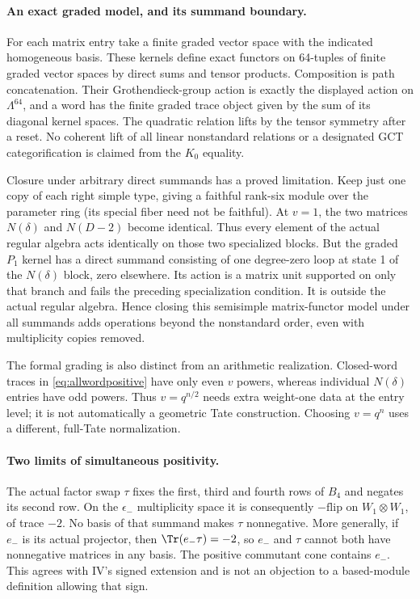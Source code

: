 \paragraph{An exact graded model, and its summand boundary.}
For each matrix entry take a finite graded vector space with the
indicated homogeneous basis. These kernels define exact functors
on 64-tuples of finite graded vector spaces by direct sums and
tensor products. Composition is path concatenation. Their
Grothendieck-group action is exactly the displayed action on
$\Lambda^{64}$, and a word has the finite graded trace object
given by the sum of its diagonal kernel spaces.
The quadratic relation lifts by the tensor symmetry after a reset.
No coherent lift of all linear nonstandard relations or a
designated GCT categorification is claimed from the $K_0$ equality.

Closure under arbitrary direct summands has a proved limitation.
Keep just one copy of each right simple type, giving a faithful
rank-six module over the parameter ring (its special fiber need not
be faithful). At $v=1$, the two matrices $N(\delta)$
and $N(D-2)$ become identical. Thus every element of the actual
regular algebra acts identically on those two specialized blocks.
But the graded $P_1$ kernel has a direct summand consisting of
one degree-zero loop at state 1 of the $N(\delta)$ block, zero
elsewhere. Its action is a matrix unit supported on only that
branch and fails the preceding specialization condition.
It is outside the actual regular algebra. Hence closing this
semisimple matrix-functor model under all summands adds operations
beyond the nonstandard order, even with multiplicity copies removed.

The formal grading is also distinct from an arithmetic realization.
Closed-word traces in \eqref{eq:allwordpositive} have only even
$v$ powers, whereas individual $N(\delta)$ entries have odd powers.
Thus $v=q^{n/2}$ needs extra weight-one data at the entry level;
it is not automatically a geometric Tate construction.
Choosing $v=q^n$ uses a different, full-Tate normalization.

\paragraph{Two limits of simultaneous positivity.}
The actual factor swap $\tau$ fixes the first, third and fourth
rows of $B_4$ and negates its second row.
On the $\epsilon_-$ multiplicity space it is consequently
$-\mathrm{flip}$ on $W_1\otimes W_1$, of trace $-2$.
No basis of that summand makes $\tau$ nonnegative.
More generally, if $e_-$ is its actual projector, then
$\Tr(e_-\tau)=-2$, so $e_-$ and $\tau$ cannot both have
nonnegative matrices in any basis. The positive commutant cone
contains $e_-$. This agrees with IV's signed extension and is not
an objection to a based-module definition allowing that sign.

